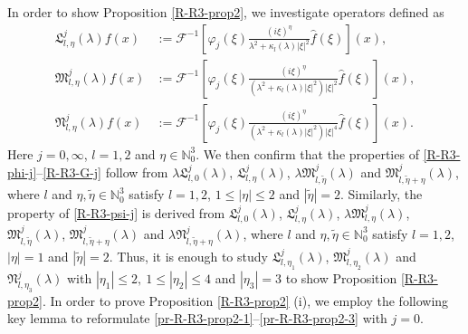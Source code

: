 \documentclass[dvipdfmx,12pt]{article}
\begin{document}
\vskip 1mm

In order to show Proposition \ref{R-R3-prop2}, we investigate operators defined as
\begin{align}
\mathfrak{L}_{l,\eta}^j(\lambda)f(x)&:=\mathcal{F}^{-1}\left[\varphi_j(\xi)\frac{(i\xi)^\eta}{\lambda^2+\kappa_l(\lambda)|\xi|^2}\widehat{f}(\xi)\right](x),
\label{pr-R-R3-prop2-1}\\
\mathfrak{M}_{l,\eta}^j(\lambda)f(x)&:=\mathcal{F}^{-1}\left[\varphi_j(\xi)\frac{(i\xi)^\eta}{(\lambda^2+\kappa_l(\lambda)|\xi|^2)|\xi|^2}\widehat{f}(\xi)\right](x), 
\label{pr-R-R3-prop2-2}\\
\mathfrak{N}_{l,\eta}^j(\lambda)f(x)&:=\mathcal{F}^{-1}\left[\varphi_j(\xi)\frac{(i\xi)^\eta}{(\lambda^2+\kappa_l(\lambda)|\xi|^2)|\xi|^4}\widehat{f}(\xi)\right](x).
\label{pr-R-R3-prop2-3}
\end{align} 
Here $j=0,\infty$, $l=1,2$ and $\eta\in \mathbb{N}_0^3$. We then confirm that the properties of \eqref{R-R3-phi-j}--\eqref{R-R3-G-j} follow from $\lambda\mathfrak{L}_{l,0}^j(\lambda)$, $\mathfrak{L}_{l,\eta}^j(\lambda)$, $\lambda\mathfrak{M}_{l,\widetilde{\eta} }^j(\lambda)$ and $\mathfrak{M}_{l,\widetilde{\eta}+\eta}^j(\lambda)$, where $l$ and $\eta,\widetilde{\eta}\in\mathbb{N}_0^3$ satisfy $l=1,2$, $1\le|\eta|\le 2$ and $|\widetilde{\eta}|=2$. Similarly, the property of \eqref{R-R3-psi-j} is derived from $\mathfrak{L}_{l,0}^j(\lambda)$, $\mathfrak{L}_{l,\eta}^j(\lambda)$, $\lambda\mathfrak{M}_{l,\eta }^j(\lambda)$, $\mathfrak{M}_{l,\tilde{\eta} }^j(\lambda)$, $\mathfrak{M}_{l,\widetilde{\eta}+\eta}^j(\lambda)$ and $\lambda\mathfrak{N}_{l,\widetilde{\eta}+\eta}^j(\lambda)$, where $l$ and $\eta,\widetilde{\eta}\in\mathbb{N}_0^3$ satisfy $l=1,2$, $|\eta|= 1$ and $|\widetilde{\eta}|=2$. Thus, it is enough to study   $\mathfrak{L}_{l,\eta_1}^j(\lambda)$, $\mathfrak{M}_{l,\eta_2}^j(\lambda)$ and $\mathfrak{N}_{l,\eta_3}^j(\lambda)$ with $|\eta_1|\le 2,~1\le|\eta_2|\le 4$ and $|\eta_3|=3$ to show Proposition \ref{R-R3-prop2}. 
In order to prove Proposition \ref{R-R3-prop2} (i), we employ the following key lemma to reformulate \eqref{pr-R-R3-prop2-1}--\eqref{pr-R-R3-prop2-3} with $j=0$.
\end{document}
